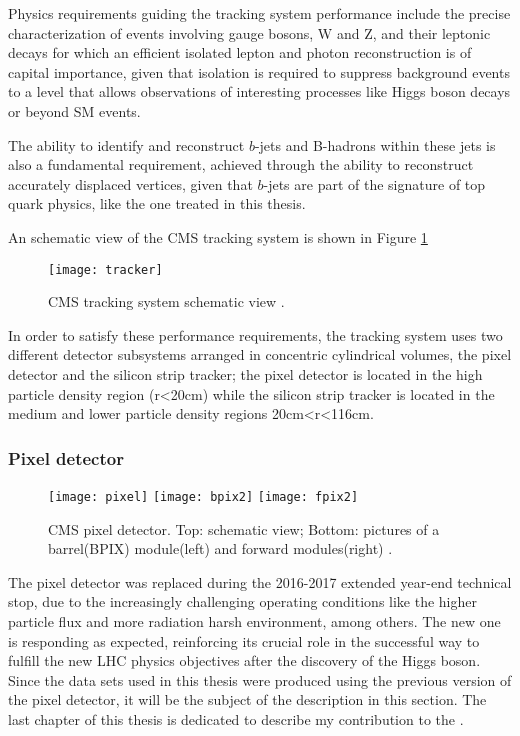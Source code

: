 Physics requirements guiding the tracking system performance include the precise characterization of events involving gauge bosons, W and Z, and their leptonic decays for which an efficient isolated lepton and photon reconstruction is of capital importance, given that isolation is required to suppress background events to a level that allows observations of interesting processes like Higgs boson decays or beyond SM events.

The ability to identify and reconstruct $b$-jets and B-hadrons within these jets is also a fundamental requirement, achieved through the ability to reconstruct accurately displaced vertices, given that $b$-jets are part of the signature of top quark physics, like the one treated in this thesis.

An schematic view of the CMS tracking system is shown in Figure \ref{fig:tracker} 

\begin{figure}[h!]
  \centering
  \texttt{[image: tracker]}
  \caption[CMS tracking system schematic view.]{CMS tracking system schematic view \cite{tracker}.}
  \label{fig:tracker}
\end{figure}

In order to satisfy these performance requirements, the tracking system uses two different detector subsystems arranged in concentric cylindrical volumes, the pixel detector and the silicon strip tracker; the pixel detector is located in the high particle density region (r<20cm) while the silicon strip tracker is located in the medium and lower particle density regions 20cm<r<116cm.        

\subsubsection*{Pixel detector}


\begin{figure}[h!]
  \centering
  \texttt{[image: pixel]}
  \texttt{[image: bpix2]}
  \texttt{[image: fpix2]}
  \caption[CMS pixel detector]{CMS pixel detector. Top: schematic view; Bottom: pictures of a barrel(BPIX) module(left) and forward modules(right) \cite{cms}.}
  \label{fig:pixel_det}
\end{figure}

The pixel detector was replaced during the 2016-2017 extended year-end technical stop, due to the increasingly challenging operating conditions like the higher particle flux and more radiation harsh environment, among others. The new one is responding as expected, reinforcing its crucial role in the successful way to fulfill the new LHC physics objectives after the discovery of the Higgs boson. Since the data sets used in this thesis were produced using the previous version of the pixel detector, it will be the subject of the description in this section. The last chapter of this thesis is dedicated to describe my contribution to the .

